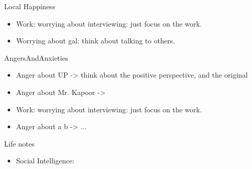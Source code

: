 \documentclass[serif, mathserif, final]{beamer}
\begin{document}
\begin{frame}
\begin{columns}
\begin{column}{0.25\linewidth}
      \begin{block}{Local Happiness}
        \begin{itemize} 
          \tiny \item \tiny Work: worrying about interviewing: just focus on the work. 
        \item \tiny Worrying about gal: think about talking to others. 
        \end{itemize}
      \end{block} 
      \begin{block}{AngersAndAnxieties}
        \begin{itemize}
          \tiny \item \tiny Anger about UP -> think about the positive
            perspective, and the original
          \item \tiny Anger about Mr. Kapoor ->  
          \item \tiny Work: worrying about interviewing: just
          focus on the work. 
          \item \tiny Anger about a b  -> ...
        \end{itemize}
      \end{block}
      \begin{block}{Life notes}
        \begin{itemize}
        \tiny \item \tiny Social Intelligence: 
        \end{itemize}
      \end{block}
\end{column}



\end{columns}
\end{frame}
\end{document}
